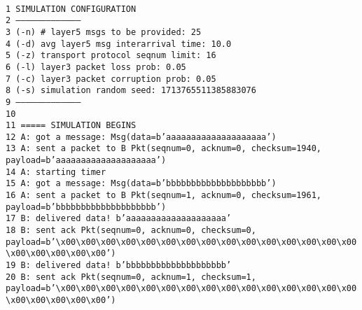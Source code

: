 \documentclass{article}
\begin{document}
\newcommand{\an}[1]{\hspace*{10mm} \textcolor{red}{#1}}
\texttt{\\1 SIMULATION CONFIGURATION \\
2 -------------------------------------- \\
3 (-n) \# layer5 msgs to be provided:      25 \\
4 (-d) avg layer5 msg interarrival time:  10.0 \\
5 (-z) transport protocol seqnum limit:   16 \\
6 (-l) layer3 packet loss prob:           0.05 \\
7 (-c) layer3 packet corruption prob:     0.05 \\
8 (-s) simulation random seed:            1713765511385883076 \\
9 -------------------------------------- \\
10  \\
11 ===== SIMULATION BEGINS \\
12 A: got a message: Msg(data=b'aaaaaaaaaaaaaaaaaaaa') \\
13 A: sent a packet to B Pkt(seqnum=0, acknum=0, checksum=1940,
payload=b'aaaaaaaaaaaaaaaaaaaa') \\
14 A: starting timer \\
15 A: got a message: Msg(data=b'bbbbbbbbbbbbbbbbbbbb') \\
16 A: sent a packet to B Pkt(seqnum=1, acknum=0, checksum=1961,
payload=b'bbbbbbbbbbbbbbbbbbbb') \\
17 B: delivered data! b'aaaaaaaaaaaaaaaaaaaa' \\
18 B: sent ack Pkt(seqnum=0, acknum=0, checksum=0,
payload=b'\textbackslash{}x00\textbackslash{}x00\textbackslash{}x00\textbackslash{}x00\textbackslash{}x00\textbackslash{}x00\textbackslash{}x00\textbackslash{}x00\textbackslash{}x00\textbackslash{}x00\textbackslash{}x00\textbackslash{}x00\textbackslash{}x00\textbackslash{}x00\textbackslash{}x00\textbackslash{}x00\textbackslash{}x00\textbackslash{}x00\textbackslash{}x00\textbackslash{}x00')
\\
19 B: delivered data! b'bbbbbbbbbbbbbbbbbbbb' \\
20 B: sent ack Pkt(seqnum=0, acknum=1, checksum=1,
payload=b'\textbackslash{}x00\textbackslash{}x00\textbackslash{}x00\textbackslash{}x00\textbackslash{}x00\textbackslash{}x00\textbackslash{}x00\textbackslash{}x00\textbackslash{}x00\textbackslash{}x00\textbackslash{}x00\textbackslash{}x00\textbackslash{}x00\textbackslash{}x00\textbackslash{}x00\textbackslash{}x00\textbackslash{}x00\textbackslash{}x00\textbackslash{}x00\textbackslash{}x00')
}
\end{document}
